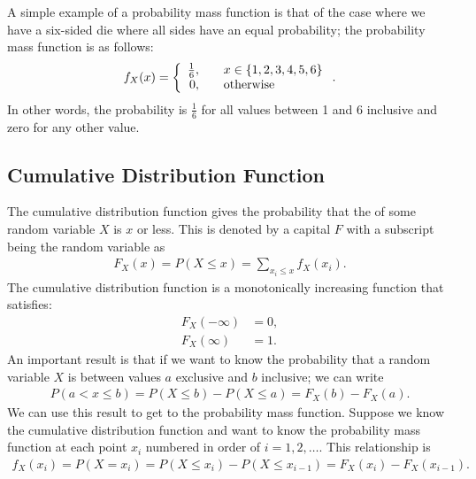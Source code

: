 A simple example of a probability mass function is that of the case where we have a six-sided die where all sides have an equal probability; the probability mass function is as follows:
\begin{align}
  f_X(x) = \left\{ \begin{array}{r l}
  \frac{1}{6}, & \quad x \in \left\{ 1, 2, 3, 4, 5, 6 \right\} \\
  0, & \quad \text{otherwise} \\ \end{array} \right. .
\end{align}
In other words, the probability is $\tfrac{1}{6}$ for all values between 1 and 6 inclusive and zero for any other value.


\subsection{Cumulative Distribution Function}

The cumulative distribution function gives the probability that the of some random variable $X$ is $x$ or less. This is denoted by a capital $F$ with a subscript being the random variable as
\begin{align}
  F_X(x) = P( X \le x ) = \sum_{x_i \le x} f_X(x_i) .
\end{align}
The cumulative distribution function is a monotonically increasing function that satisfies:
\begin{align}
  F_X(-\infty) &= 0, \nonumber \\
  F_X(\infty)  &= 1. \nonumber
\end{align}
An important result is that if we want to know the probability that a random variable $X$ is between values $a$ exclusive and $b$ inclusive; we can write
\begin{align}
  P( a < x \le b ) = P( X \le b ) - P( X \le a ) = F_X(b) - F_X(a) .
\end{align}
We can use this result to get to the probability mass function. Suppose we know the cumulative distribution function and want to know the probability mass function at each point $x_i$ numbered in order of $i = 1, 2, \ldots$. This relationship is
\begin{align}
  f_X(x_i) = P( X = x_i ) = P( X \le x_i ) - P( X \le x_{i-1} ) = F_X(x_i) - F_X(x_{i-1}) .
\end{align}

